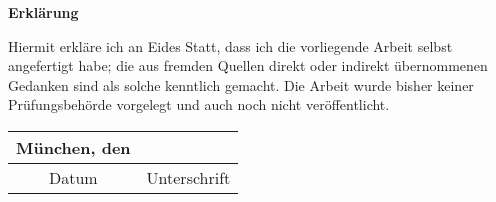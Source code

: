 \thispagestyle{empty}
\begin{center}
\huge \textbf{Erklärung}
\end{center}
\vspace{5cm}
Hiermit erkläre ich an Eides Statt, dass ich die vorliegende Arbeit selbst angefertigt habe; 
die aus fremden Quellen direkt oder indirekt übernommenen Gedanken sind als solche kenntlich 
gemacht. Die Arbeit wurde bisher keiner Prüfungsbehörde vorgelegt und auch noch nicht veröffentlicht.
\vspace*{8cm}
\begin{table}[h!]
 \centering
 \begin{tabular}{cc}
  München, den \iftoggle{german}{\ThesisPubDate}{\germandate{\ThesisPubDate}} & \hspace*{6cm} \\
  \midrule
  Datum								& Unterschrift\\
 \end{tabular}
\end{table}